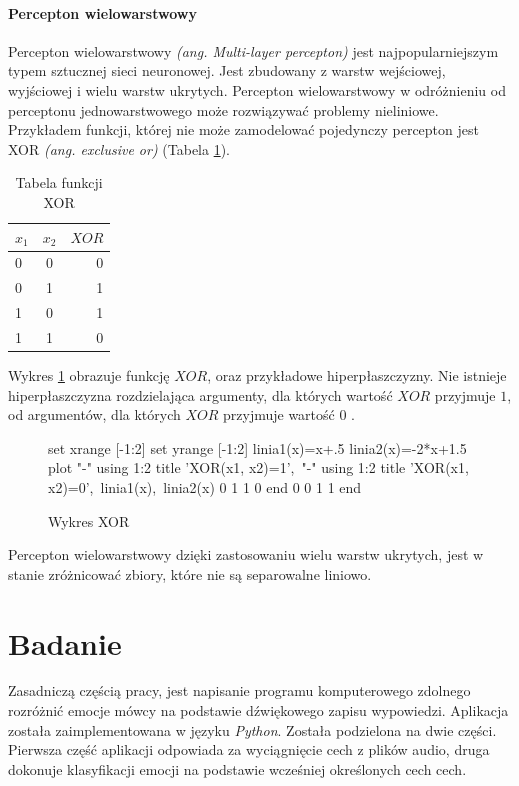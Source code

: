 \documentclass[a4paper,12pt,twoside,openany]{report}
\newcommand{\ang}[1]{\textit{(ang. #1)}}
\newcommand{\Tab}[1]{(Tabela \ref{#1})}
\begin{document}
\subsubsection{Percepton wielowarstwowy}
Percepton wielowarstwowy \ang{Multi-layer percepton} jest najpopularniejszym typem sztucznej sieci neuronowej.
Jest zbudowany z warstw wejściowej, wyjściowej i wielu warstw ukrytych.
Percepton wielowarstwowy w odróżnieniu od perceptonu jednowarstwowego może rozwiązywać problemy nieliniowe.
Przykładem funkcji, której nie może zamodelować pojedynczy percepton jest XOR \ang{exclusive or} \Tab{tab:mlp:xor}.
\begin{table}[h]
	\centering
	\begin{tabular}{ |l|c|r| }
		\hline
		$x_1$	& $x_2$& $XOR$ \\ \hline
		0 	& 0 	& 0 \\ \hline
		0 	& 1 	& 1 \\ \hline
		1 	& 0 	& 1 \\ \hline
		1 	& 1 	& 0 \\ \hline
	\end{tabular}
	\caption{Tabela funkcji XOR}
	\label{tab:mlp:xor}
\end{table}
Wykres \ref{wyk:mlp:xor} obrazuje funkcję $XOR$, oraz przykładowe hiperpłaszczyzny.
Nie istnieje hiperpłaszczyzna rozdzielająca argumenty, dla których wartość $XOR$ przyjmuje $1$,
od argumentów, dla których $XOR$ przyjmuje wartość $0$ \cite{Labib2010}.
\begin{figure}[h]
	\label{wyk:mlp:sigm}
	\centering
	\begin{gnuplot}[terminal=pdf,terminaloptions=color]
		set xrange [-1:2]
		set yrange [-1:2]
		linia1(x)=x+.5
		linia2(x)=-2*x+1.5
		plot "-" using 1:2 title 'XOR(x1, x2)=1',\
		"-" using 1:2  title 'XOR(x1, x2)=0',\
		linia1(x),\
		linia2(x)
		0	1
		1	0
		end
		0	0
		1	1
		end
	\end{gnuplot}
	\caption{Wykres XOR}
	\label{wyk:mlp:xor}
\end{figure}
Percepton wielowarstwowy dzięki zastosowaniu wielu warstw ukrytych, 
jest w stanie zróżnicować zbiory, które nie są separowalne liniowo.
\chapter{Badanie}
Zasadniczą częścią pracy, jest napisanie programu komputerowego zdolnego rozróżnić emocje mówcy na podstawie dźwiękowego zapisu wypowiedzi.
Aplikacja została zaimplementowana w języku \textit{Python}. 
Została podzielona na dwie części. 
Pierwsza część aplikacji odpowiada za wyciągnięcie cech z plików audio,
druga dokonuje klasyfikacji emocji na podstawie wcześniej określonych cech cech.
\end{document}
